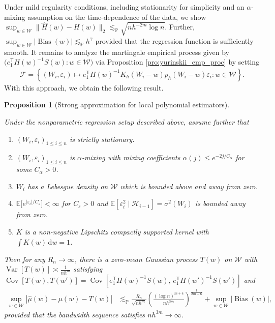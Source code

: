 \documentclass[11pt,lof]{puthesis}
\renewcommand{\P}{\ensuremath{\mathbb{P}}}
\newcommand{\E}{\ensuremath{\mathbb{E}}}
\newcommand{\cH}{\ensuremath{\mathcal{H}}}
\newcommand{\cF}{\ensuremath{\mathcal{F}}}
\newcommand{\cW}{\ensuremath{\mathcal{W}}}
\newcommand{\T}{\ensuremath{\mathsf{T}}}
\DeclareMathOperator{\Var}{Var}
\DeclareMathOperator{\Cov}{Cov}
\DeclareMathOperator{\Bias}{Bias}
\newcommand{\diff}[1]{\,\mathrm{d}#1}
\theoremstyle{break}
\newtheorem{proposition}{Proposition}[section]
\theoremstyle{proof}
\begin{document}
Under mild regularity conditions, including stationarity for simplicity
and an $\alpha$-mixing assumption on the time-dependence of the data, we show
$\sup_{w\in\cW} \|\hat H(w)-H(w)\|_2
\lesssim_\P \sqrt{n h^{-2m}\log n}$.
Further,
$\sup_{w\in\cW} |\Bias(w)|
\lesssim_\P h^\gamma$
provided that the regression function is sufficiently smooth.
It remains to analyze the martingale empirical process given by
$\big(e_1^\T H(w)^{-1} S(w) : w\in\cW\big)$
via Proposition \ref{pro:yurinskii_emp_proc} by setting
%
\begin{align*}
\cF = \left\{
(W_i, \varepsilon_i) \mapsto
e_1^\T H(w)^{-1}
K_h(W_i-w) p_h(W_i-w) \varepsilon_i
: w \in \cW
\right\}.
\end{align*}
%
With this approach, we obtain the following result.

\begin{proposition}[Strong approximation for local polynomial estimators]%
\label{pro:yurinskii_local_poly}

Under the nonparametric regression setup described above,
assume further that
%
\begin{enumerate}[label=(\roman*)]

\item
$(W_i, \varepsilon_i)_{1 \leq i \leq n}$
is strictly stationary.

\item
$(W_i, \varepsilon_i)_{1 \leq i \leq n}$
is $\alpha$-mixing with mixing coefficients
$\alpha(j) \leq e^{-2 j / C_\alpha}$
for some $C_\alpha > 0$.

\item
$W_i$ has a Lebesgue density on $\cW$
which is bounded above and away from zero.

\item
$\E\big[e^{|\varepsilon_i|/C_\varepsilon}\big] < \infty$
for $C_\varepsilon > 0$ and
$\E\left[\varepsilon^2_i \mid \cH_{i-1}\right]=\sigma^2(W_i)$
is bounded away from zero.

\item
$K$ is a non-negative Lipschitz
compactly supported kernel with
$\int K(w) \diff{w} = 1$.

\end{enumerate}
%
Then for any $R_n \to \infty$,
there is a zero-mean Gaussian process
$T(w)$ on $\cW$
with $\Var[T(w)] \asymp\frac{1}{n h^m}$
satisfying
$\Cov[T(w), T(w')]
= \Cov[e_1^\T H(w)^{-1} S(w),\, e_1^\T H(w')^{-1} S(w')]$
and
%
\begin{align*}
\sup_{w \in \cW}
\left|\hat \mu(w) - \mu(w) - T(w) \right|
&\lesssim_\P
\frac{R_n}{\sqrt{n h^m}}
\left(
\frac{(\log n)^{m+4}}{n h^{3m}}
\right)^{\frac{1}{2m+6}}
+ \sup_{w \in \cW} |\Bias(w)|,
\end{align*}
%
provided that the bandwidth sequence satisfies
$n h^{3m} \to \infty$.
%
\end{proposition}
\end{document}
